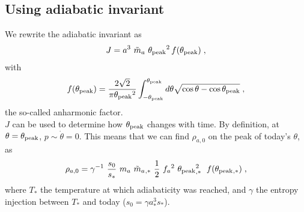 \documentclass[10pt,utf8,compress,xcolor=dvipsnames]{beamer}
\begin{document}
\subsection{Using adiabatic invariant}
\begin{frame}{\insertsubsectionhead}
	We rewrite the adiabatic invariant as
	\begin{equation*}
	J = a^3 \ \tilde m_{a}{} \ \theta_{\rm peak}{}^2  \, f(\theta_{\rm peak}{})  \;,
	\end{equation*}
	with 
	\begin{equation*}
	f(\theta_{\rm peak}{}) =\dfrac{ 2 \sqrt{2}}{\pi \theta_{\rm peak}{}^2 } \displaystyle \int_{- \theta_{\rm peak}{}}^{\theta_{\rm peak}{}} d \theta \sqrt{ \cos \theta - \cos \theta_{\rm peak}{} } \;,
	\end{equation*}
	the so-called anharmonic factor.\pause \\[0.5cm]
	
	$J$ can be used to determine how $\theta_{\rm peak}{}$ changes with time. By definition, at $\theta=\theta_{\rm peak}{}$, $p \sim \dot \theta = 0$.
	This means that we can find $\rho_{a,0}$ on the peak of today's $\theta$, as
	\begin{equation*}
	\rho_{a,0} = \gamma^{-1} \ \dfrac{s_0}{s_*} \ \ma \ \maT_{,*} \ \dfrac{1}{2} \ \fa^2 \ \thetamax_{,*}^2 \;  \ f(\thetamax_{,*}) \;,
	\end{equation*}
	where $T_{*}$ the temperature at which adiabaticity was reached, and $\gamma$ the entropy injection between $T_*$ and today (\ie $s_0 = \gamma a_*^3 s_*$). 	  
\end{frame}
%
\end{document}
